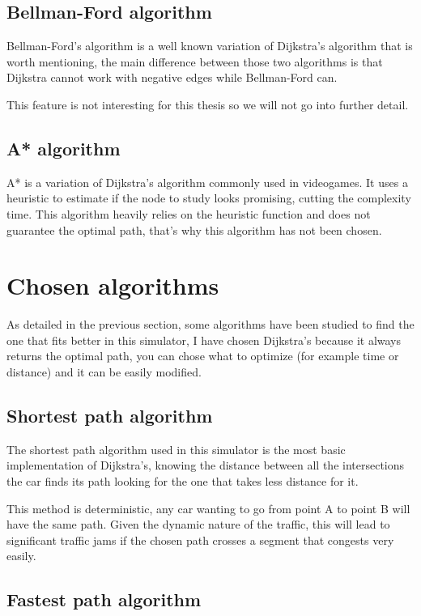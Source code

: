 \subsection{Bellman-Ford algorithm}

Bellman-Ford's algorithm is a well known variation of Dijkstra's algorithm that is worth mentioning, the main difference between those two algorithms is that Dijkstra cannot work with negative edges while Bellman-Ford can.

This feature is not interesting for this thesis so we will not go into further detail.

\subsection{A* algorithm}

A* is a variation of Dijkstra's algorithm commonly used in videogames. It uses a heuristic to estimate if the node to study looks promising, cutting the complexity time. This algorithm heavily relies on the heuristic function and does not guarantee the optimal path, that's why this algorithm has not been chosen.

\section{Chosen algorithms}

As detailed in the previous section, some algorithms have been studied to find the one that fits better in this simulator, I have chosen Dijkstra's because it always returns the optimal path, you can chose what to optimize (for example time or distance) and it can be easily modified.

\subsection{Shortest path algorithm}

The shortest path algorithm used in this simulator is the most basic implementation of Dijkstra's, knowing the distance between all the intersections the car finds its path looking for the one that takes less distance for it.

This method is deterministic, any car wanting to go from point A to point B will have the same path. Given the dynamic nature of the traffic, this will lead to significant traffic jams if the chosen path crosses a segment that congests very easily.

\subsection{Fastest path algorithm}

